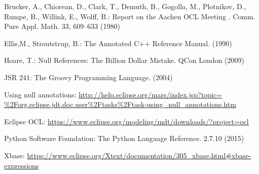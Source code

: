 \documentclass{llncs}
\begin{document}
%
%
\begin{thebibliography}{}
%
Brucker, A., Chiorean, D., Clark, T., Demuth, B., Gogolla, M., Plotnikov, D., Rumpe, B., Willink, E., Wolff, B.:
Report on the Aachen OCL Meeting .
Comm. Pure Appl. Math. 33, 609--633 (1980)

Ellis,M., Stroutstrup, B.:
The Annotated C++ Reference Manual.
(1990)

Hoare, T.:
Null References: The Billion Dollar Mistake.
QCon London (2009)

JSR 241:
The Groovy Programming Language.
(2004)

Using null annotations:
\url{http://help.eclipse.org/mars/index.jsp?topic=
\%2Forg.eclipse.jdt.doc.user\%2Ftasks\%2Ftask-using\_null\_annotations.htm}

Eclipse OCL:
\url{https://www.eclipse.org/modeling/mdt/downloads/?project=ocl}

Python Software Foundation:
The Python Language Reference.
2.7.10 (2015)

Xbase:
\url{https://www.eclipse.org/Xtext/documentation/305\_xbase.html\#xbase-expressions}

\end{thebibliography}
\end{document}
